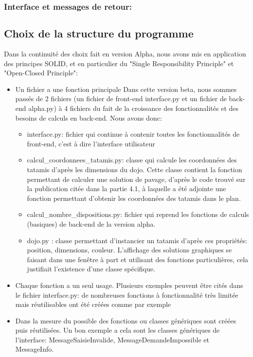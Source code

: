 \subsubsection*{Interface et messages de retour:}


\subsection{Choix de la structure du programme}

Dans la continuité des choix fait en version Alpha, nous avons mis en application des principes SOLID, et en particulier du
"Single Responsibility Principle" et "Open-Closed Principle":

\begin{itemize}
    \item Un fichier a une fonction principale
          Dans cette version beta, nous sommes passés de 2 fichiers (un fichier de front-end interface.py et un fichier de back-end alpha.py) à
          4 fichiers du fait de la croissance des fonctionnalités et des besoins de calculs en back-end. Nous avons donc:
          \begin{itemize}
              \item interface.py: fichier qui continue à contenir toutes les fonctionnalités de front-end, c’est à dire l’interface utilisateur
              \item calcul\_coordonnees\_tatamis.py: classe qui calcule les coordonnées des tatamis d'après les dimensions du dojo.
                    Cette classe contient la fonction permettant de calculer une solution de pavage, d’après le code trouvé sur la publication
                    citée dans la partie 4.1, à laquelle a été adjointe une fonction permettant d’obtenir les coordonnées des tatamis dans le plan.
              \item calcul\_nombre\_dispositions.py: fichier qui reprend les fonctions de calculs (basiques) de back-end de la version alpha.
              \item dojo.py : classe permettant d'instancier un tatamis d'après ces propriétés: position, dimensions, couleur. L’affichage
                    des solutions graphiques se faisant dans une fenêtre à part et utilisant des fonctions particulières, cela justifiait
                    l’existence d’une classe spécifique.
          \end{itemize}
    \item Chaque fonction a un seul usage. Plusieurs exemples peuvent être cités dans le fichier interface.py: de nombreuses
          fonctions à fonctionnalité très limitée mais réutilisables ont été créées comme par exemple
    \item Dans la mesure du possible des fonctions ou classes génériques sont créées puis réutilisées.
          Un bon exemple a cela sont les classes génériques de l’interface: MessageSaisieInvalide, MessageDemandeImpossible et MessageInfo.
\end{itemize}



